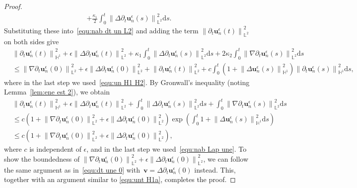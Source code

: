 \documentclass[11pt,reqno]{amsart}
\theoremstyle{definition}
\numberwithin{equation}{section}
\newcommand{\bff}{\boldsymbol}
\newcommand{\bb}{\mathbb}
\newcommand{\ds}{\mathrm{d}s}
\newcommand{\pa}{\partial}
\newcommand{\norm}[2]{\left\|{#1}\right\|_{#2}}
\begin{document}
\begin{proof}
\begin{align*}
		+
		\frac{\kappa_1}{2} \int_0^t \norm{\Delta \pa_t \bff{u}_n^\epsilon(s)}{\bb{L}^2}^2 \ds.
	\end{align*}
	Substituting these into~\eqref{equ:nab dt un L2} and adding the term $\norm{\pa_t \bff{u}_n^\epsilon(t)}{\bb{L}^2}^2$ on both sides give
	\begin{align*}
		&\norm{\pa_t \bff{u}_n^\epsilon(t)}{\bb{H}^1}^2
		+
		\epsilon \norm{\Delta \pa_t \bff{u}_n^\epsilon(t)}{\bb{L}^2}^2
		+
		\kappa_1 \int_0^t \norm{\Delta \pa_t \bff{u}_n^\epsilon(s)}{\bb{L}^2}^2 \ds 
		+
		2\kappa_2 \int_0^t \norm{\nabla \pa_t \bff{u}_n^\epsilon(s)}{\bb{L}^2}^2 \ds 
		\\
		&\leq
		\norm{\nabla \pa_t \bff{u}_n^\epsilon(0)}{\bb{L}^2}^2
		+
		\epsilon \norm{\Delta \pa_t \bff{u}_n^\epsilon(0)}{\bb{L}^2}^2
		+
		\norm{\pa_t \bff{u}_n^\epsilon(t)}{\bb{L}^2}^2
		+
		c\int_0^t \left(1+\norm{\Delta \bff{u}_n^\epsilon(s)}{\bb{H}^1}^2\right) \norm{\pa_t \bff{u}_n^\epsilon(s)}{\bb{H}^1}^2 \ds,
	\end{align*}
	where in the last step we used~\eqref{equ:un H1 H2}. By Gronwall's inequality (noting Lemma~\ref{lem:ene est 2}), we obtain
	\begin{align*}
		&\norm{\pa_t \bff{u}_n^\epsilon(t)}{\bb{H}^1}^2
		+
		\epsilon \norm{\Delta \pa_t \bff{u}_n^\epsilon(t)}{\bb{L}^2}^2
		+
		\int_0^t \norm{\Delta \pa_t \bff{u}_n^\epsilon(s)}{\bb{L}^2}^2 \ds 
		+
		\int_0^t \norm{\nabla \pa_t \bff{u}_n^\epsilon(s)}{\bb{L}^2}^2 \ds 
		\\
		&\leq
		c\left(1+\norm{\nabla \pa_t \bff{u}_n^\epsilon(0)}{\bb{L}^2}^2
		+
		\epsilon \norm{\Delta \pa_t \bff{u}_n^\epsilon(0)}{\bb{L}^2}^2\right) 
		\exp \left(\int_0^t 1+\norm{\Delta \bff{u}_n^\epsilon(s)}{\bb{H}^1}^2 \ds \right)
		\\
		&\leq
		c\left(1+\norm{\nabla \pa_t \bff{u}_n^\epsilon(0)}{\bb{L}^2}^2
		+
		\epsilon \norm{\Delta \pa_t \bff{u}_n^\epsilon(0)}{\bb{L}^2}^2\right),
	\end{align*}
	where $c$ is independent of $\epsilon$, and in the last step we used~\eqref{equ:nab Lap une}. To show the boundedness of $\norm{\nabla \pa_t \bff{u}_n^\epsilon(0)}{\bb{L}^2}^2 +
	\epsilon \norm{\Delta \pa_t \bff{u}_n^\epsilon(0)}{\bb{L}^2}^2$, we can follow the same argument as in~\eqref{equ:dt une 0} with~$\bff{v}=\Delta \pa_t \bff{u}_n^\epsilon(0)$ instead. This, together with an argument similar to \eqref{equ:unt H1a}, completes the proof.
\end{proof}
\end{document}
